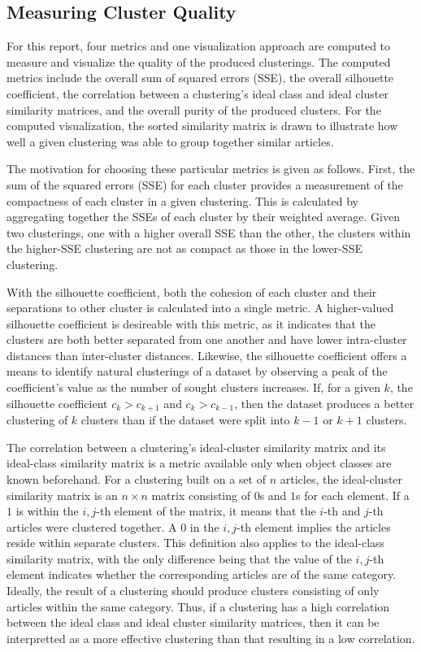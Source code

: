 \documentclass[11pt]{article}
\begin{document}
\subsection{Measuring Cluster Quality}

For this report, four metrics and one visualization approach are computed to measure and visualize the quality of the produced clusterings.
The computed metrics include the overall sum of squared errors (SSE), the overall silhouette coefficient, the correlation between a clustering's ideal class and ideal cluster similarity matrices, and the overall purity of the produced clusters.
For the computed visualization, the sorted similarity matrix is drawn to illustrate how well a given clustering was able to group together similar articles.

The motivation for choosing these particular metrics is given as follows.
First, the sum of the squared errors (SSE) for each cluster provides a measurement of the compactness of each cluster in a given clustering.
This is calculated by aggregating together the SSEs of each cluster by their weighted average.
Given two clusterings, one with a higher overall SSE than the other, the clusters within the higher-SSE clustering are not as compact as those in the lower-SSE clustering.

With the silhouette coefficient, both the cohesion of each cluster and their separations to other cluster is calculated into a single metric.
A higher-valued silhouette coefficient is desireable with this metric, as it indicates that the clusters are both better separated from one another and have lower intra-cluster distances than inter-cluster distances.
Likewise, the silhouette coefficient offers a means to identify natural clusterings of a dataset by observing a peak of the coefficient's value as the number of sought clusters increases.
If, for a given $k$, the silhouette coefficient $c_{k} > c_{k+1}$ and $c_{k} > c_{k-1}$, then the dataset produces a better clustering of $k$ clusters than if the dataset were split into $k-1$ or $k+1$ clusters.

The correlation between a clustering's ideal-cluster similarity matrix and its ideal-class similarity matrix is a metric available only when object classes are known beforehand.
For a clustering built on a set of $n$ articles, the ideal-cluster similarity matrix is an $n \times n$ matrix consisting of $0$s and $1$s for each element.
If a $1$ is within the $i,j$-th element of the matrix, it means that the $i$-th and $j$-th articles were clustered together.
A $0$ in the $i,j$-th element implies the articles reside within separate clusters.
This definition also applies to the ideal-class similarity matrix, with the only difference being that the value of the $i,j$-th element indicates whether the corresponding articles are of the same category.
Ideally, the result of a clustering should produce clusters consisting of only articles within the same category.
Thus, if a clustering has a high correlation between the ideal class and ideal cluster similarity matrices, then it can be interpretted as a more effective clustering than that resulting in a low correlation.
\end{document}

